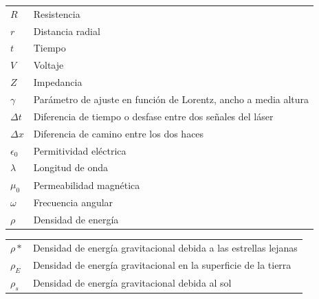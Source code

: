 \begin{tabular}{ll}
$R$ & Resistencia\\
$r$ & Distancia radial\\
$t$ & Tiempo\\
$V$ & Voltaje\\
$Z$ & Impedancia\\
$\gamma$ & Parámetro de ajuste en función de Lorentz, ancho a media altura\\
$\Delta t$ & Diferencia de tiempo o desfase entre dos señales del láser\\
$\Delta x$ & Diferencia de camino entre los dos haces \\
$\epsilon_0$ & Permitividad eléctrica\\
$\lambda$ & Longitud de onda\\
$\mu_0$ & Permeabilidad magnética\\
$\omega$ & Frecuencia angular\\
$\rho$ & Densidad de energía
\end{tabular}
\begin{tabular}{ll}
$\rho*$ & Densidad de energía gravitacional debida a las estrellas lejanas\\
$\rho_E$ & Densidad de energía gravitacional en la superficie de la tierra\\
$\rho_s$ & Densidad de energía gravitacional debida al sol
  
\end{tabular}





